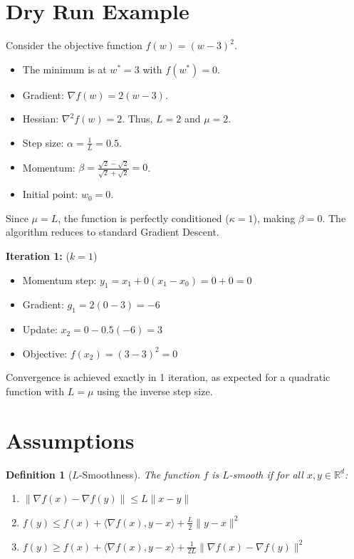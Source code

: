 \documentclass{article}
\newtheorem{definition}[theorem]{Definition}
\begin{document}
\section*{Dry Run Example}
Consider the objective function $f(w) = (w - 3)^2$.
\begin{itemize}
    \item The minimum is at $w^* = 3$ with $f(w^*) = 0$.
    \item Gradient: $\nabla f(w) = 2(w - 3)$.
    \item Hessian: $\nabla^2 f(w) = 2$. Thus, $L = 2$ and $\mu = 2$.
    \item Step size: $\alpha = \frac{1}{L} = 0.5$.
    \item Momentum: $\beta = \frac{\sqrt{2} - \sqrt{2}}{\sqrt{2} + \sqrt{2}} = 0$.
    \item Initial point: $w_0 = 0$.
\end{itemize}
Since $\mu = L$, the function is perfectly conditioned ($\kappa = 1$), making $\beta = 0$. The algorithm reduces to standard Gradient Descent.

\textbf{Iteration 1:} ($k=1$)
\begin{itemize}
    \item Momentum step: $y_1 = x_1 + 0(x_1 - x_0) = 0 + 0 = 0$
    \item Gradient: $g_1 = 2(0 - 3) = -6$
    \item Update: $x_2 = 0 - 0.5(-6) = 3$
    \item Objective: $f(x_2) = (3 - 3)^2 = 0$
\end{itemize}
Convergence is achieved exactly in 1 iteration, as expected for a quadratic function with $L=\mu$ using the inverse step size.

\section*{Assumptions}
\begin{definition}[$L$-Smoothness]
The function $f$ is $L$-smooth if for all $x, y \in \mathbb{R}^d$:
\begin{enumerate}
    \item $\|\nabla f(x) - \nabla f(y)\| \le L \|x - y\|$
    \item $f(y) \le f(x) + \langle \nabla f(x), y - x \rangle + \frac{L}{2}\|y - x\|^2$
    \item $f(y) \ge f(x) + \langle \nabla f(x), y - x \rangle + \frac{1}{2L}\|\nabla f(x) - \nabla f(y)\|^2$
\end{enumerate}
\end{definition}
\end{document}
